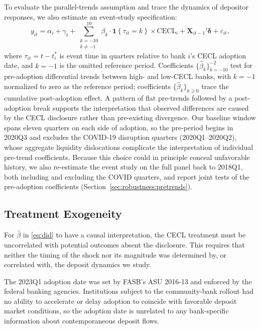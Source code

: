 To evaluate the parallel-trends assumption and trace the dynamics of depositor
responses, we also estimate an event-study specification:
\begin{equation}
  y_{it}
  = \alpha_i + \gamma_t
  + \sum_{\substack{k=-10 \\ k \neq -1}}^{10}
    \beta_k \cdot \mathbf{1}\!\left\{\tau_{it} = k\right\}
    \times \mathrm{CECL}_i
  + \mathbf{X}_{it-1}'\boldsymbol{\delta}
  + \varepsilon_{it},
  \label{eq:eventstudy}
\end{equation}
where $\tau_{it} = t - t_i^{*}$ is event time in quarters relative to bank
$i$'s CECL adoption date, and $k = -1$ is the omitted reference period.
Coefficients $\{\hat{\beta}_k\}_{k=-10}^{-2}$ test for pre-adoption
differential trends between high- and low-CECL banks, with $k=-1$ normalized
to zero as the reference period; coefficients $\{\hat{\beta}_k\}_{k \geq 0}$
trace the cumulative post-adoption effect.  A pattern of flat pre-trends
followed by a post-adoption break supports the interpretation that observed
differences are caused by the CECL disclosure rather than pre-existing
divergence.  Our baseline window spans eleven quarters on each side of
adoption, so the pre-period begins in 2020Q3 and excludes the COVID-19
disruption quarters (2020Q1--2020Q2), whose aggregate liquidity dislocations
complicate the interpretation of individual pre-trend coefficients.  Because
this choice could in principle conceal unfavorable history, we
also re-estimate the event study on the full panel back to 2018Q1, both
including and excluding the COVID quarters, and report joint tests of the
pre-adoption coefficients (Section~\ref{sec:robustness:pretrends}).


\subsection{Treatment Exogeneity}
\label{sec:identification:predetermination}

For $\hat{\beta}$ in \eqref{eq:did} to have a causal interpretation,
the CECL treatment must be uncorrelated with potential outcomes absent the
disclosure.  This requires that neither the timing of the shock nor its
magnitude was determined by, or correlated with, the deposit dynamics we
study.

The 2023Q1 adoption date was set by FASB's ASU 2016-13 and enforced by the
federal banking agencies.  Institutions subject to the community-bank rollout
had no ability to accelerate or delay adoption to coincide with favorable
deposit market conditions, so the adoption date is unrelated to any
bank-specific information about contemporaneous deposit flows.


